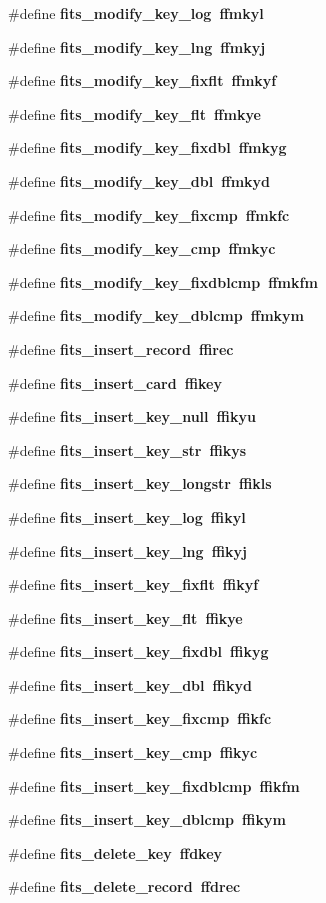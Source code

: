 \begin{CompactItemize}
\#define \bf{fits\_\-modify\_\-key\_\-log}~ffmkyl
\item 
\#define \bf{fits\_\-modify\_\-key\_\-lng}~ffmkyj
\item 
\#define \bf{fits\_\-modify\_\-key\_\-fixflt}~ffmkyf
\item 
\#define \bf{fits\_\-modify\_\-key\_\-flt}~ffmkye
\item 
\#define \bf{fits\_\-modify\_\-key\_\-fixdbl}~ffmkyg
\item 
\#define \bf{fits\_\-modify\_\-key\_\-dbl}~ffmkyd
\item 
\#define \bf{fits\_\-modify\_\-key\_\-fixcmp}~ffmkfc
\item 
\#define \bf{fits\_\-modify\_\-key\_\-cmp}~ffmkyc
\item 
\#define \bf{fits\_\-modify\_\-key\_\-fixdblcmp}~ffmkfm
\item 
\#define \bf{fits\_\-modify\_\-key\_\-dblcmp}~ffmkym
\item 
\#define \bf{fits\_\-insert\_\-record}~ffirec
\item 
\#define \bf{fits\_\-insert\_\-card}~ffikey
\item 
\#define \bf{fits\_\-insert\_\-key\_\-null}~ffikyu
\item 
\#define \bf{fits\_\-insert\_\-key\_\-str}~ffikys
\item 
\#define \bf{fits\_\-insert\_\-key\_\-longstr}~ffikls
\item 
\#define \bf{fits\_\-insert\_\-key\_\-log}~ffikyl
\item 
\#define \bf{fits\_\-insert\_\-key\_\-lng}~ffikyj
\item 
\#define \bf{fits\_\-insert\_\-key\_\-fixflt}~ffikyf
\item 
\#define \bf{fits\_\-insert\_\-key\_\-flt}~ffikye
\item 
\#define \bf{fits\_\-insert\_\-key\_\-fixdbl}~ffikyg
\item 
\#define \bf{fits\_\-insert\_\-key\_\-dbl}~ffikyd
\item 
\#define \bf{fits\_\-insert\_\-key\_\-fixcmp}~ffikfc
\item 
\#define \bf{fits\_\-insert\_\-key\_\-cmp}~ffikyc
\item 
\#define \bf{fits\_\-insert\_\-key\_\-fixdblcmp}~ffikfm
\item 
\#define \bf{fits\_\-insert\_\-key\_\-dblcmp}~ffikym
\item 
\#define \bf{fits\_\-delete\_\-key}~ffdkey
\item 
\#define \bf{fits\_\-delete\_\-record}~ffdrec
\item 

\end{CompactItemize}
